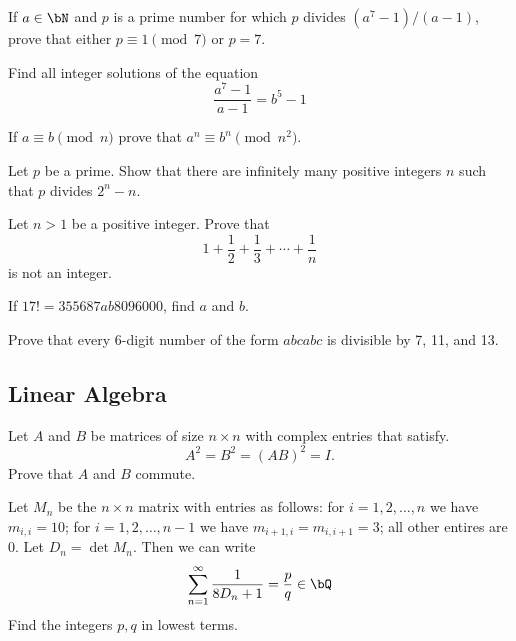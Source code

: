 \documentclass[12pt]{article}
\begin{document}
        \begin{exercise}
            If $a\in \bN$ and $p$ is a prime number for which $p$ divides $(a^7-1)/(a-1)$, prove that either $p \equiv 1 \pmod{7}$ or $p=7$.
        \end{exercise}
        
        \begin{exercise}
            Find all integer solutions of the equation
            \[\frac{a^7-1}{a-1} = b^5-1\]
        \end{exercise}
        
        \begin{exercise}
            If $a\equiv b \pmod{n}$ prove that $a^n \equiv b^n \pmod{n^2}$.
        \end{exercise}
        
        \begin{exercise}
            Let $p$ be a prime. Show that there are infinitely many positive integers $n$ such that $p$ divides $2^n-n$.
        \end{exercise}
        
        \begin{exercise}
            Let $n>1$ be a positive integer. Prove that 
            \[1+\frac{1}{2}+\frac{1}{3}+\cdots + \frac{1}{n}\] is not an integer.
        \end{exercise}

        \begin{exercise}
            If \(17!=355687ab8096000\), find \(a\) and \(b\).
        \end{exercise}
    
        \begin{exercise}
            Prove that every 6-digit number of the form \(abcabc\) is divisible by 7, 11, and 13.
        \end{exercise}

    \subsection{Linear Algebra}

        \begin{exercise}
            Let \(A\) and  \(B\) be matrices of size \(n\times n\) with complex entries that satisfy.
            \[A^2 = B^2 = (AB)^2 = I.\]
            Prove that \(A\) and \(B\) commute.
        \end{exercise}

        \begin{exercise}
            Let \(M_n\) be the \(n\times n\) matrix with entries as follows: for \(i=1,2,\ldots,n\) we have \(m_{i,i}=10\); for \(i=1,2,\ldots,n-1\) we have \(m_{i+1,i}=m_{i,i+1}=3\); all other entires are 0.
            Let \(D_n=\det M_n\).
            Then we can write
            \[\sum_{n=1}^\infty \frac{1}{8D_n+1} = \frac{p}{q}\in\bQ\]
            Find the integers \(p,q\) in lowest terms.
        \end{exercise}
\end{document}
